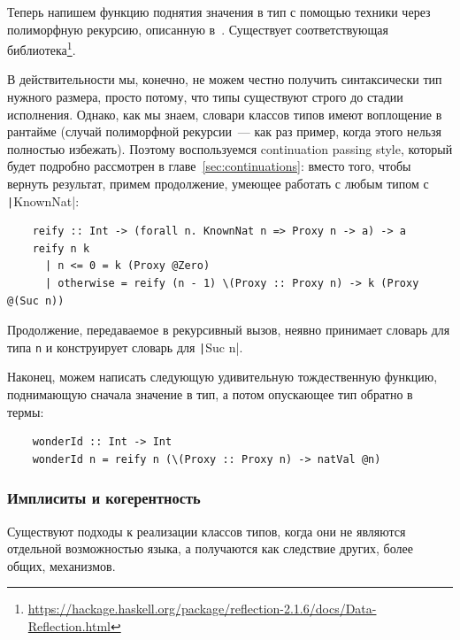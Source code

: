 Теперь напишем функцию поднятия значения в тип с помощью техники через полиморфную рекурсию, описанную в~\cite{kiselyov2004functional}.
Существует соответствующая библиотека\footnote{\url{https://hackage.haskell.org/package/reflection-2.1.6/docs/Data-Reflection.html}}.

В действительности мы, конечно, не можем честно получить синтаксически тип нужного размера, просто потому, что типы существуют строго до стадии исполнения.
Однако, как мы знаем, словари классов типов имеют воплощение в рантайме (случай полиморфной рекурсии~--- как раз пример, когда этого нельзя полностью избежать).
Поэтому воспользуемся continuation passing style, который будет подробно рассмотрен в главе~\ref{sec:continuations}: вместо того, чтобы вернуть результат, примем продолжение, умеющее работать с любым типом с \texttt|KnownNat|:
\begin{verbatim}
    reify :: Int -> (forall n. KnownNat n => Proxy n -> a) -> a
    reify n k
      | n <= 0 = k (Proxy @Zero)
      | otherwise = reify (n - 1) \(Proxy :: Proxy n) -> k (Proxy @(Suc n))
\end{verbatim}

Продолжение, передаваемое в рекурсивный вызов, неявно принимает словарь для типа \texttt{n} и конструирует словарь для \texttt|Suc n|.

Наконец, можем написать следующую удивительную тождественную функцию, поднимающую сначала значение в тип, а потом опускающее тип обратно в термы:
\begin{verbatim}
    wonderId :: Int -> Int
    wonderId n = reify n (\(Proxy :: Proxy n) -> natVal @n)
\end{verbatim}

\subsubsection{Имплиситы и когерентность}

Существуют подходы к реализации классов типов, когда они не являются отдельной возможностью языка, а получаются как следствие других, более общих, механизмов.

